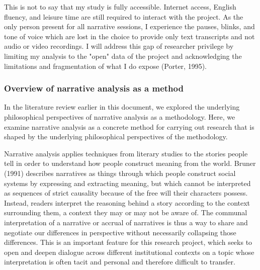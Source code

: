 This is not to say that my study is fully accessible. Internet access, English fluency, and leisure time are still required to interact with the project. As the only person present for all narrative sessions, I experience the pauses, blinks, and tone of voice which are lost in the choice to provide only text transcripts and not audio or video recordings. I will address this gap of researcher privilege by limiting my analysis to the "open" data of the project and acknowledging the limitations and fragmentation of what I do expose (Porter, 1995).

\subsubsection{Overview of narrative analysis as a method}

In the literature review earlier in this document, we explored the underlying philosophical perspectives of narrative analysis as a methodology. Here, we examine narrative analysis as a concrete method for carrying out research that is shaped by the underlying philosophical perspectives of the methodology.

Narrative analysis applies techniques from literary studies to the stories people tell in order to understand how people construct meaning from the world. Bruner (1991) describes narratives as things through which people construct social systems by expressing and extracting meaning, but which cannot be interpreted as sequences of strict causality because of the free will their characters possess. Instead, readers interpret the reasoning behind a story according to the context surrounding them, a context they may or may not be aware of. The communal interpretation of a narrative or accrual of narratives is thus a way to share and negotiate our differences in perspective without necessarily collapsing those differences. This is an important feature for this research project, which seeks to open and deepen dialogue across different institutional contexts on a topic whose interpretation is often tacit and personal and therefore difficult to transfer.

